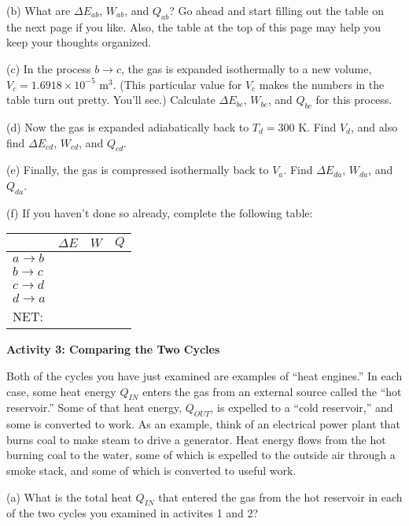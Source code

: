 (b) What are $\Delta E_{ab}$, $W_{ab}$, and $Q_{ab}$?  Go ahead and start filling out the table on the next page if you like.  Also, the table at the top of this page may help you keep your thoughts organized.
\answerspace{1.6in}

\pagebreak
(c) In the process $b \rightarrow c$, the gas is expanded isothermally to a new volume, $V_c=1.6918 \times 10^{-5}$ m$^3$.  (This particular value for $V_c$ makes the numbers in the table turn out pretty.  You'll see.)  Calculate $\Delta E_{bc}$, $W_{bc}$, and $Q_{bc}$ for this process.  
\answerspace{1.6in}

(d) Now the gas is expanded adiabatically back to $T_d=300$ K.  Find $V_d$, and also find  $\Delta E_{cd}$, $W_{cd}$, and $Q_{cd}$.
\answerspace{2.0in}


(e) Finally, the gas is compressed isothermally back to $V_a$.  Find $\Delta E_{da}$, $W_{da}$, and $Q_{da}$.  
\answerspace{1.6in}



(f) If you haven't done so already, complete the following table:
\vspace{0.1 in}

{\renewcommand{\arraystretch}{2.0}
\begin{tabular}{| C{1in} |C{1in} | C{1in} | C{1in} |}
\hline
& $\Delta E$ & $W$ & $Q$ \\ \hline
$a \rightarrow b$ & & & \\ \hline
$b \rightarrow c$ & & & \\ \hline
$c \rightarrow d$ & & & \\ \hline
$d \rightarrow a$ & & & \\
\hhline{|=|=|=|=|}
NET: & & & \\ \hline
\end{tabular}
}

\pagebreak
\textbf{Activity 3: Comparing the Two Cycles}

Both of the cycles you have just examined are examples of ``heat engines.''  In each case, some heat energy $Q_{IN}$ enters the gas from an external source called the ``hot reservoir.''   Some of that heat energy, $Q_{OUT}$, is expelled to a ``cold reservoir,'' and some is converted to work.    As an example, think of an electrical power plant that burns coal to make steam to drive a generator.  Heat energy flows from the hot burning coal to the water, some of which is expelled to the outside air through a smoke stack, and some of which is converted to useful work.

(a)  What is the total heat $Q_{IN}$ that entered the gas from the hot reservoir in each of the two cycles you examined in activites 1 and 2?

